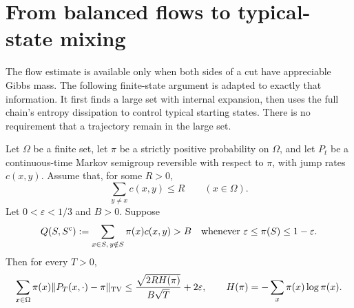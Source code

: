 \setcounter{equation}{13}
\section{From balanced flows to typical-state mixing}\label{sec:mixing}

The flow estimate is available only when both sides of a cut have
appreciable Gibbs mass. The following finite-state argument is adapted
to exactly that information. It first finds a large set with internal
expansion, then uses the full chain's entropy dissipation to control
typical starting states. There is no requirement that a trajectory
remain in the large set.

\begin{lemma}\label{lem:pruning}
Let $\Omega$ be a finite set, let $\pi$ be a strictly positive
probability on $\Omega$, and let $P_t$ be a continuous-time Markov
semigroup reversible with respect to $\pi$, with jump rates $c(x,y)$.
Assume that, for some $R>0$,
\[
 \sum_{y\ne x}c(x,y)\le R\qquad(x\in\Omega).
\]
Let $0<\varepsilon<1/3$ and $B>0$. Suppose
\[
 Q(S,S^{\rm c}):=\sum_{x\in S,\,y\notin S}\pi(x)c(x,y)>B
 \quad\text{whenever }\varepsilon\le\pi(S)\le1-\varepsilon.
\]
Then for every $T>0$,
\begin{equation}\label{eq:averaged-mixing}
 \sum_{x\in\Omega}\pi(x)\|P_T(x,\cdot)-\pi\|_{\rm TV}
 \le\frac{\sqrt{2R H(\pi)}}{B\sqrt T}+2\varepsilon,
 \qquad H(\pi)=-\sum_x\pi(x)\log\pi(x).
\end{equation}
\end{lemma}


